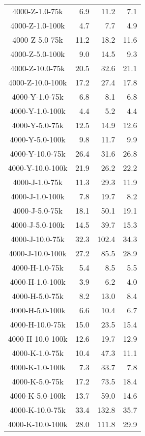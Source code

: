 \begin{longtable}{crrr}
    4000-Z-1.0-75k &   6.9 &   11.2 &   7.1 \\
    4000-Z-1.0-100k &   4.7 &    7.7 &   4.9 \\
    4000-Z-5.0-75k &  11.2 &   18.2 &  11.6 \\
    4000-Z-5.0-100k &   9.0 &   14.5 &   9.3 \\
    4000-Z-10.0-75k &  20.5 &   32.6 &  21.1 \\
    4000-Z-10.0-100k &  17.2 &   27.4 &  17.8 \\
    4000-Y-1.0-75k &   6.8 &    8.1 &   6.8 \\
    4000-Y-1.0-100k &   4.4 &    5.2 &   4.4 \\
    4000-Y-5.0-75k &  12.5 &   14.9 &  12.6 \\
    4000-Y-5.0-100k &   9.8 &   11.7 &   9.9 \\
    4000-Y-10.0-75k &  26.4 &   31.6 &  26.8 \\
    4000-Y-10.0-100k &  21.9 &   26.2 &  22.2 \\
    4000-J-1.0-75k &  11.3 &   29.3 &  11.9 \\
    4000-J-1.0-100k &   7.8 &   19.7 &   8.2 \\
    4000-J-5.0-75k &  18.1 &   50.1 &  19.1 \\
    4000-J-5.0-100k &  14.5 &   39.7 &  15.3 \\
    4000-J-10.0-75k &  32.3 &  102.4 &  34.3 \\
    4000-J-10.0-100k &  27.2 &   85.5 &  28.9 \\
    4000-H-1.0-75k &   5.4 &    8.5 &   5.5 \\
    4000-H-1.0-100k &   3.9 &    6.2 &   4.0 \\
    4000-H-5.0-75k &   8.2 &   13.0 &   8.4 \\
    4000-H-5.0-100k &   6.6 &   10.4 &   6.7 \\
    4000-H-10.0-75k &  15.0 &   23.5 &  15.4 \\
    4000-H-10.0-100k &  12.6 &   19.7 &  12.9 \\
    4000-K-1.0-75k &  10.4 &   47.3 &  11.1 \\
    4000-K-1.0-100k &   7.3 &   33.7 &   7.8 \\
    4000-K-5.0-75k &  17.2 &   73.5 &  18.4 \\
    4000-K-5.0-100k &  13.7 &   59.0 &  14.6 \\
    4000-K-10.0-75k &  33.4 &  132.8 &  35.7 \\
    4000-K-10.0-100k &  28.0 &  111.8 &  29.9 \\

\end{longtable}
